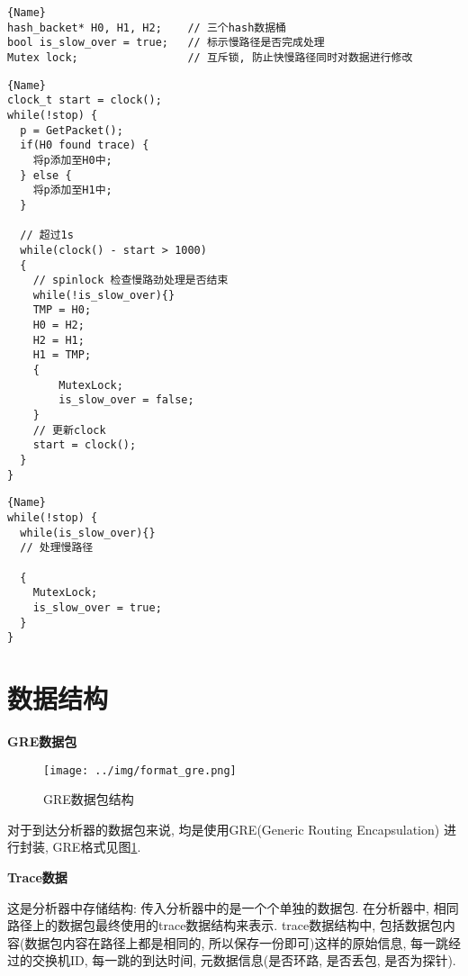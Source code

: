 \begin{lstlisting}[caption=数据结构,frame=tlrb]{Name}
hash_backet* H0, H1, H2;    // 三个hash数据桶
bool is_slow_over = true;   // 标示慢路径是否完成处理
Mutex lock;                 // 互斥锁, 防止快慢路径同时对数据进行修改
\end{lstlisting}

\noindent\begin{minipage}{.55\textwidth}
\begin{lstlisting}[caption=快路径线程,frame=tlrb]{Name}
clock_t start = clock();
while(!stop) {
  p = GetPacket();
  if(H0 found trace) {
    将p添加至H0中;
  } else {
    将p添加至H1中;
  }

  // 超过1s
  while(clock() - start > 1000)
  {
    // spinlock 检查慢路劲处理是否结束
    while(!is_slow_over){}
    TMP = H0;
    H0 = H2;
    H2 = H1;
    H1 = TMP;
    {
        MutexLock;
        is_slow_over = false;
    }
    // 更新clock
    start = clock();
  }
}
\end{lstlisting}
\end{minipage}\hfill
\begin{minipage}{.38\textwidth}
\begin{lstlisting}[caption=慢路径线程,frame=tlrb]{Name}
while(!stop) {
  while(is_slow_over){}
  // 处理慢路径

  {
    MutexLock;
    is_slow_over = true;
  }
}
\end{lstlisting}
\end{minipage}

\section{数据结构}

\textbf{GRE数据包}

\begin{figure}[htbp!]
  \centering
  \texttt{[image: ../img/format\_gre.png]}
  \caption{GRE数据包结构}
  \label{fig:gre_packet}
\end{figure}

对于到达分析器的数据包来说, 均是使用GRE(Generic Routing Encapsulation)
进行封装, GRE格式见图\ref{fig:gre_packet}.

\textbf{Trace数据}

这是分析器中存储结构: 传入分析器中的是一个个单独的数据包.
在分析器中, 相同路径上的数据包最终使用的trace数据结构来表示. trace数据结构中,
包括数据包内容(数据包内容在路径上都是相同的, 所以保存一份即可)这样的原始信息,
每一跳经过的交换机ID, 每一跳的到达时间, 元数据信息(是否环路, 是否丢包, 是否为探针).

